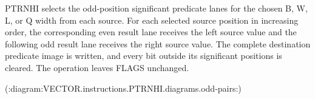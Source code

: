 PTRNHI selects the odd-position significant predicate lanes for the chosen B, W, L, or Q width from each source.
For each selected source position in increasing order, the corresponding even result lane receives the left source value and the following odd result lane receives the right source value.
The complete destination predicate image is written, and every bit outside its significant positions is cleared.
The operation leaves FLAGS unchanged.

(:diagram:VECTOR.instructions.PTRNHI.diagrams.odd-pairs:)
